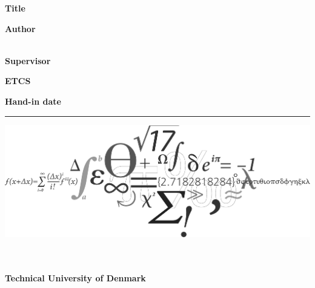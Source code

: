 \begin{spacing}{1}
    
    \textbf{Title}\\
    \thesistitle
    
    \textbf{Author}\\
    \thesisauthor\\
    \studentnumber
    
    \textbf{Supervisor}\\
    \thesissupervisor
    
    \textbf{ETCS}\\
    \thesisetcs
    
    \textbf{Hand-in date}\\
    \thedate
    
    \vspace{2.5cm}

    \vspace{0.05cm}
    \hrule width 7cm \relax
    \thesisauthor

    \vspace*{-16ex}

    \begin{centering}
        \includegraphics[width=1.9\textwidth]{frontmatter/front_gfx/dtu_frise_gray.pdf}
    \end{centering}
    
    \vspace*{-10ex}
   
    
    {
    \raggedleft
    \small
    \textbf{\department\\\departmentdescriber\\Technical University of Denmark\\}
    \vspace{1em}
    \addressI\\\addressII\\\addressIII\\\departmentemail\\\departmentwebsite\\
    }
    
\end{spacing}

\newpage